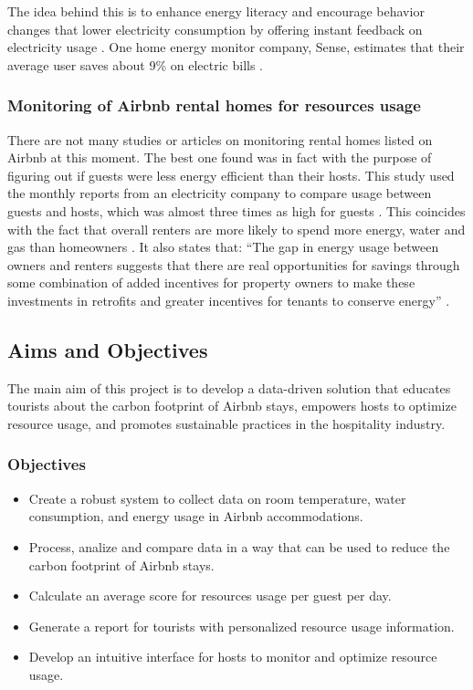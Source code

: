 \documentclass[12pt]{extarticle}
\begin{document}
The idea behind this is to enhance energy literacy and encourage behavior changes that lower electricity consumption by offering instant feedback on electricity usage \cite{Webb2014}. One 
home energy monitor company, Sense, estimates that their average user saves about 9\% on electric bills \cite{Walker2023}.

\subsubsection{Monitoring of Airbnb rental homes for resources usage}

There are not many studies or articles on monitoring rental homes listed on Airbnb at this moment. The best one found was in fact with the purpose of figuring out if guests were less 
energy efficient than their hosts. This study used the monthly reports from an electricity company to compare usage between guests and hosts, which was almost three times as high for 
guests \cite{Halford2023}. This coincides with the fact that overall renters are more likely to spend more energy, water and gas than homeowners \cite{Jeunesse2013}. It also states 
that: \enquote{The gap in energy usage between owners and renters suggests that there are real opportunities for savings through some combination of added incentives for property owners to 
make these investments in retrofits and greater incentives for tenants to conserve energy} \cite{Jeunesse2013}.

\subsection{Aims and Objectives}

The main aim of this project is to develop a data-driven solution that educates tourists about the carbon footprint of Airbnb stays, empowers hosts to optimize resource usage, and 
promotes sustainable practices in the hospitality industry.

\subsubsection{Objectives}

\begin{itemize}
    \item Create a robust system to collect data on room temperature, water consumption, and energy usage in Airbnb accommodations.
    \item Process, analize and compare data in a way that can be used to reduce the carbon footprint of Airbnb stays.
    \item Calculate an average score for resources usage per guest per day.
    \item Generate a report for tourists with personalized resource usage information.
    \item Develop an intuitive interface for hosts to monitor and optimize resource usage.
\end{itemize}
\end{document}
